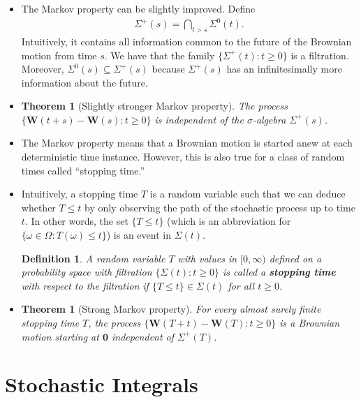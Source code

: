 \documentclass[10pt]{article}
\newtheorem{theorem}[lemma]{Theorem}
\newtheorem{definition}[lemma]{Definition}
\newcommand{\ve}[1]{\mathbf{#1}}
\begin{document}
\begin{itemize}
  \item The Markov property can be slightly improved. Define
  \begin{align*}
    \Sigma^+(s) = \bigcap_{t > s} \Sigma^0(t).
  \end{align*}
  Intuitively, it contains all information common to the future of the Brownian motion from time $s$. We have that the family $\{ \Sigma^+(t): t \geq 0 \}$ is a filtration. Moreover, $\Sigma^0(s) \subseteq \Sigma^+(s)$ because $\Sigma^+(s)$ has an infinitesimally more information about the future.

  \item \begin{theorem}[Slightly stronger Markov property]
    The process $\{ \ve{W}(t+s) - \ve{W}(s) : t \geq 0 \}$ is independent of the $\sigma$-algebra $\Sigma^+(s)$.
  \end{theorem}

  \item The Markov property means that a Brownian motion is started anew at each deterministic time instance. However, this is also true for a class of random times called ``stopping time.''
  
  \item Intuitively, a stopping time $T$ is a random variable such that we can deduce whether $T \leq t$ by only observing the path of the stochastic process up to time $t$. In other words, the set $\{ T \leq t\}$ (which is an abbreviation for $\{ \omega \in \Omega : T(\omega) \leq t \} $) is an event in $\Sigma(t)$.
  
  \begin{definition}
    A random variable $T$ with values in $[0,\infty)$ defined on a probability space with filtration $\{ \Sigma(t): t \geq 0 \}$ is called a {\bf stopping time} with respect to the filtration if $\{ T \leq t \} \in \Sigma(t)$ for all $t \geq 0$.
  \end{definition}

  \item \begin{theorem}[Strong Markov property]
    For every almost surely finite stopping time $T$, the process $\{ \ve{W}(T+t) - \ve{W}(T) : t \geq 0 \}$ is a Brownian motion starting at $\ve{0}$ independent of $\Sigma^+(T)$.
  \end{theorem}
\end{itemize}

\section{Stochastic Integrals}
\end{document}
